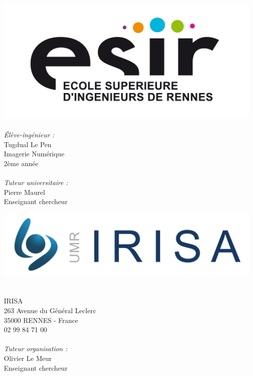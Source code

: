 \documentclass[12pt, openany]{report}
\begin{document}
\begin{titlepage}
  \begin{center}

    \begin{minipage}{0.45\textwidth}
      \begin{flushleft} \large
        \includegraphics[width=0.9\columnwidth]{datas/logo_esir.jpg}~\\
        \emph{Élève-ingénieur :}\\
        Tugdual Le Pen\\
        Imagerie Numérique\\
        2ème année\\
        ~\\
        \emph{Tuteur universitaire :}\\
        Pierre Maurel\\
        Enseignant chercheur
      \end{flushleft}
    \end{minipage}
    \begin{minipage}{0.45\textwidth}
      \begin{flushright} \large
        \vspace{19pt}
        \includegraphics[width=0.9\columnwidth]{datas/logo_irisa.jpg}~\\~\\
        IRISA\\
        263 Avenue du Général Leclerc\\
        35000 RENNES - France\\
        02 99 84 71 00\\
        ~\\        
        \emph{Tuteur organisation :}\\
        Olivier Le Meur\\
        Enseignant chercheur\\
      \end{flushright}
    \end{minipage}


\end{center}
\end{titlepage}
\end{document}
